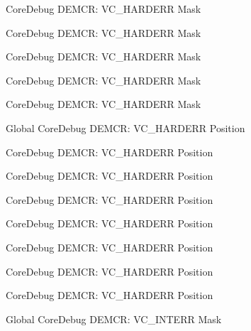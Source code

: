 \begin{DoxyRefList}
\label{deprecated__deprecated000342}%
%
Core\+Debug DEMCR\+: VC\+\_\+\+HARDERR Mask 

\label{deprecated__deprecated000418}%
%
Core\+Debug DEMCR\+: VC\+\_\+\+HARDERR Mask 

\label{deprecated__deprecated000507}%
%
Core\+Debug DEMCR\+: VC\+\_\+\+HARDERR Mask 

\label{deprecated__deprecated000609}%
%
Core\+Debug DEMCR\+: VC\+\_\+\+HARDERR Mask 

\label{deprecated__deprecated000136}%
%
Core\+Debug DEMCR\+: VC\+\_\+\+HARDERR Mask  
\item[Global \doxylink{group___c_m_s_i_s___core_debug_gaed9f42053031a9a30cd8054623304c0a}{Core\+Debug\+\_\+\+DEMCR\+\_\+\+VC\+\_\+\+HARDERR\+\_\+\+Pos} ]\label{deprecated__deprecated000341}%
%
Core\+Debug DEMCR\+: VC\+\_\+\+HARDERR Position 

\label{deprecated__deprecated000417}%
%
Core\+Debug DEMCR\+: VC\+\_\+\+HARDERR Position 

\label{deprecated__deprecated000506}%
%
Core\+Debug DEMCR\+: VC\+\_\+\+HARDERR Position 

\label{deprecated__deprecated000608}%
%
Core\+Debug DEMCR\+: VC\+\_\+\+HARDERR Position 

\label{deprecated__deprecated000135}%
%
Core\+Debug DEMCR\+: VC\+\_\+\+HARDERR Position 

\label{deprecated__deprecated000274}%
%
Core\+Debug DEMCR\+: VC\+\_\+\+HARDERR Position 

\label{deprecated__deprecated000199}%
%
Core\+Debug DEMCR\+: VC\+\_\+\+HARDERR Position 

\label{deprecated__deprecated000055}%
%
Core\+Debug DEMCR\+: VC\+\_\+\+HARDERR Position  
\item[Global \doxylink{group___c_m_s_i_s___core_debug_gad6815d8e3df302d2f0ff2c2c734ed29a}{Core\+Debug\+\_\+\+DEMCR\+\_\+\+VC\+\_\+\+INTERR\+\_\+\+Msk} ]\label{deprecated__deprecated000202}%
%
Core\+Debug DEMCR\+: VC\+\_\+\+INTERR Mask 


\end{DoxyRefList}
